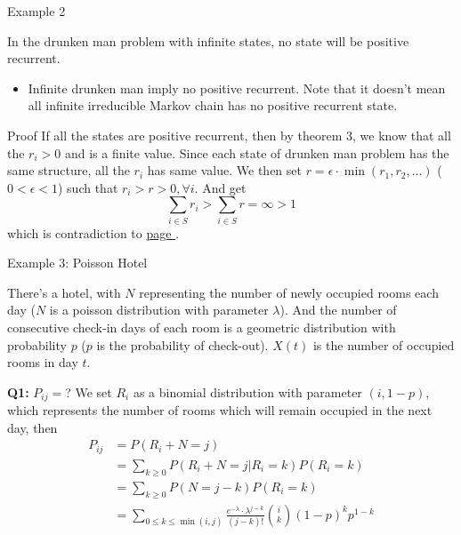 \documentclass[mathserif]{beamer}
\begin{document}
\begin{frame}{Example 2}
	\begin{example}
	In the drunken man problem with infinite states, no state will be positive recurrent.
	\end{example}
	\begin{itemize}
	\item Infinite drunken man imply no positive recurrent.
		Note that it doesn't mean all infinite irreducible Markov chain has no positive recurrent state.
	\end{itemize}
\end{frame}

\begin{frame}{Proof}
	If all the states are positive recurrent, then by theorem 3, 
	we know that all the $r_i > 0$ and is a finite value.
	Since each state of drunken man problem has the same structure, all the $r_i$ has same value.
	We then set $r = \epsilon\cdot \min (r_1, r_2, \ldots)$ ($0 < \epsilon < 1$) such that 
	$r_i > r > 0, \forall i$.
	And get
	\[
	\sum_{i\in S} r_i > \sum_{i\in S} r = \infty > 1
	\]
	which is contradiction to \hyperlink{proportion_sum}{page \pageref{proportion_sum}}.
\end{frame}

\begin{frame}{Example 3: Poisson Hotel}
	\begin{example}
	There's a hotel, with $N$ representing the number of newly occupied rooms each day ($N$ is a poisson distribution with parameter $\lambda$).
	And the number of consecutive check-in days of each room is a geometric distribution with probability $p$ ($p$ is the probability of check-out).
	$X(t)$ is the number of occupied rooms in day $t$.
	\end{example}
\end{frame}

\begin{frame}{\textbf{Q1:} $P_{ij} = $?}
	We set $R_i$ as a binomial distribution with parameter $(i, 1-p)$, which represents the number of rooms which will remain occupied in the next day, then
	\begin{align*}
	P_{ij} & = P(R_i + N = j) \\
	& = \sum_{k\geq 0} P(R_i + N = j | R_i = k)P(R_i = k) \\
	& = \sum_{k\geq 0} P(N = j-k)P(R_i = k) \\
	& = \sum_{0 \leq k \leq \min(i,j)} \frac{e^{-\lambda}\cdot \lambda^{j-k}}{(j-k)!} \binom{i}{k} (1-p)^k p^{1-k}
	\end{align*}
\end{frame}
\end{document}

